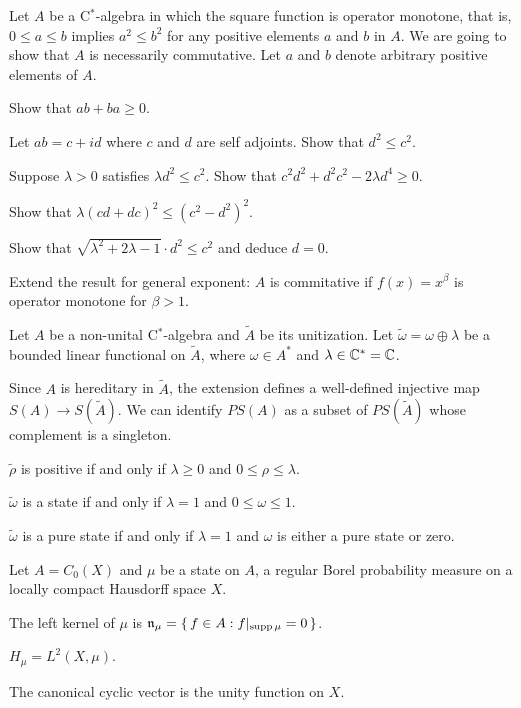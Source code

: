 \documentclass{../../large}
\begin{document}
\begin{prb}
Let $A$ be a C$^*$-algebra in which the square function is operator monotone, that is, $0\le a\le b$ implies $a^2\le b^2$ for any positive elements $a$ and $b$ in $A$.
We are going to show that $A$ is necessarily commutative.
Let $a$ and $b$ denote arbitrary positive elements of $A$.
\begin{parts}
\item
Show that $ab+ba\ge0$.
\item
Let $ab=c+id$ where $c$ and $d$ are self adjoints.
Show that $d^2\le c^2$.
\item
Suppose $\lambda>0$ satisfies $\lambda d^2\le c^2$.
Show that $c^2d^2+d^2c^2-2\lambda d^4\ge0$.
\item
Show that $\lambda(cd+dc)^2\le(c^2-d^2)^2$.
\item
Show that $\sqrt{\lambda^2+2\lambda-1}\cdot d^2\le c^2$ and deduce $d=0$.
\item
Extend the result for general exponent: $A$ is commitative if $f(x)=x^\beta$ is operator monotone for $\beta>1$.
\end{parts}
\end{prb}


\begin{prb}
Let $A$ be a non-unital C$^*$-algebra and $\tilde A$ be its unitization.
Let $\tilde\omega=\omega\oplus\lambda$ be a bounded linear functional on $\tilde A$, where $\omega\in A^*$ and $\lambda\in\mathbb{C}^*=\mathbb{C}$.

Since $A$ is hereditary in $\tilde A$, the extension defines a well-defined injective map $S(A)\to S(\tilde A)$.
We can identify $PS(A)$ as a subset of $PS(\tilde A)$ whose complement is a singleton.
\begin{parts}
\item $\tilde\rho$ is positive if and only if $\lambda\ge0$ and $0\le\rho\le\lambda$.
\item $\tilde\omega$ is a state if and only if $\lambda=1$ and $0\le\omega\le1$.
\item $\tilde\omega$ is a pure state if and only if $\lambda=1$ and $\omega$ is either a pure state or zero.
\end{parts}
\end{prb}


\begin{prb}[Representations of $C_0(X)$]
Let $A=C_0(X)$ and $\mu$ be a state on $A$, a regular Borel probability measure on a locally compact Hausdorff space $X$.
\begin{parts}
\item The left kernel of $\mu$ is $\mathfrak{n}_\mu=\{\,f\in A:f|_{\operatorname{supp}\mu}=0\,\}$.
\item $H_\mu=L^2(X,\mu)$.
\item The canonical cyclic vector is the unity function on $X$.
\end{parts}
\end{prb}
\end{document}
